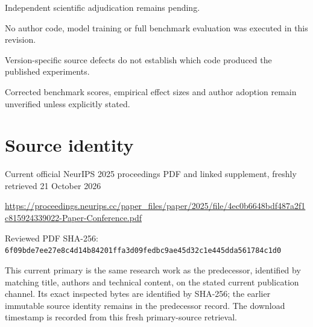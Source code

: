 \documentclass[11pt]{article}
\begin{document}
Independent scientific adjudication remains pending.\par

No author code, model training or full benchmark evaluation was executed in this revision.\par

Version-specific source defects do not establish which code produced the published experiments.\par

Corrected benchmark scores, empirical effect sizes and author adoption remain unverified unless explicitly stated.\par

\section*{Source identity}

Current official NeurIPS 2025 proceedings PDF and linked supplement, freshly retrieved 21 October 2026

\url{https://proceedings.neurips.cc/paper_files/paper/2025/file/4ec0b6648bdf487a2f1c815924339022-Paper-Conference.pdf}

Reviewed PDF SHA-256: \nolinkurl{6f09bde7ee27e8c4d14b84201ffa3d09fedbc9ae45d32c1e445dda561784c1d0}

This current primary is the same research work as the predecessor, identified by matching title, authors and technical content, on the stated current publication channel. Its exact inspected bytes are identified by SHA-256; the earlier immutable source identity remains in the predecessor record. The download timestamp is recorded from this fresh primary-source retrieval.
\end{document}
